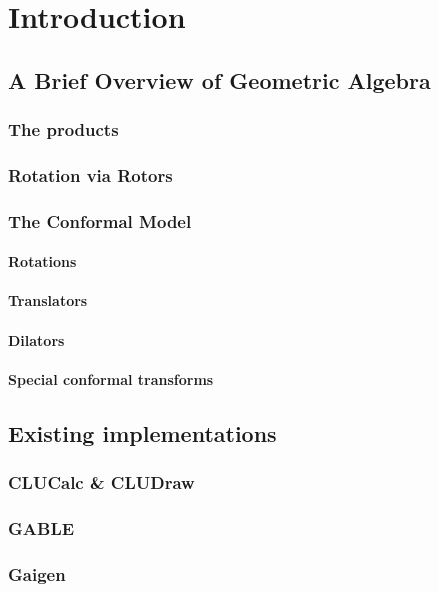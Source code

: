 \chapter{Introduction}

\section{A Brief Overview of Geometric Algebra}

\subsection{The products}

\subsection{Rotation via Rotors}

\subsection{The Conformal Model}

\subsubsection{Rotations}
\subsubsection{Translators}
\subsubsection{Dilators}
\subsubsection{Special conformal transforms}

\section{Existing implementations}

\subsection{CLUCalc \& CLUDraw}
\subsection{GABLE}
\subsection{Gaigen}
